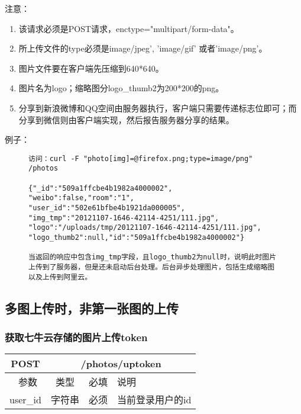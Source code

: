 注意：

\begin{enumerate}
\item 该请求必须是POST请求，enctype="multipart/form-data"。
\item 所上传文件的type必须是image/jpeg', 'image/gif' 或者'image/png'。
\item 图片文件要在客户端先压缩到640*640。
\item 图片名为logo；缩略图分logo\_thumb2为200*200的png。
\item 分享到新浪微博和QQ空间由服务器执行，客户端只需要传递标志位即可；而分享到微信则由客户端实现，然后报告服务器分享的结果。
\end{enumerate}

例子：

\begin{figure}[H]
\begin{verbatim}
访问：curl -F "photo[img]=@firefox.png;type=image/png" 
/photos

{"_id":"509a1ffcbe4b1982a4000002",
"weibo":false,"room":"1",
"user_id":"502e61bfbe4b1921da000005",
"img_tmp":"20121107-1646-42114-4251/111.jpg",
"logo":"/uploads/tmp/20121107-1646-42114-4251/111.jpg",
"logo_thumb2":null,"id":"509a1ffcbe4b1982a4000002"}

当返回的响应中包含img_tmp字段，且logo_thumb2为null时，说明此时图片上传到了服务器，但是还未启动后台处理。后台异步处理图片，包括生成缩略图以及上传到阿里云。

\end{verbatim}
\end{figure}



\subsection{多图上传时，非第一张图的上传}

\subsubsection{获取七牛云存储的图片上传token}

\begin{table}[H]
   \begin{center}
\begin{tabular}{|c|c|c|p{12cm}|}
\hline
POST & \multicolumn{3}{|c|}{/photos/uptoken} \\
\hline\hline
 \  参数  & 类型 & 必填 &  说明  \\
\hline
 user\_id  & 字符串 & 必须 &  当前登录用户的id\\
 \hline
\end{tabular}
   \end{center}
\end{table}

